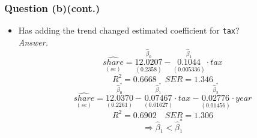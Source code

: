 \documentclass[11pt, xcolor=x11names,compress]{beamer}
\begin{document}
\begin{frame}[fragile,t]
\frametitle{Question (b)(cont.)}
\begin{itemize}
    \item Has adding the trend changed estimated coefficient for \texttt{tax}?\\
\pause
\vspace{5mm}
\textit{Answer.}
\begin{equation*}
    \underset{(se)}{\widehat{share}} = \overset{\hat{\beta}_0}{\underset{(0.2358)}{12.0207}} - \overset{\hat{\beta}_1}{\underset{(0.005336)}{0.1044}} \cdot tax
\end{equation*}
\begin{equation*}
    R^2=0.6668 \quad SER=1.346
\end{equation*}
\vspace{2mm}
\begin{equation*}
    \underset{(se)}{\widehat{share}} = \overset{\hat{\beta}_0^*}{\underset{(0.2261)}{12.0370}} - \overset{\hat{\beta}_1^*}{\underset{(0.01627)}{0.07467}} \cdot tax - \overset{\hat{\beta}_2^*}{\underset{(0.01456)}{0.02776}}\cdot year
\end{equation*}
\begin{equation*}
    R^2=0.6902   \quad SER = 1.306
\end{equation*}
\vspace{2mm}
\begin{equation*}
    \Rightarrow \hat{\beta}_1 < \hat{\beta}_1^*
\end{equation*}
\end{itemize}
\end{frame}
\end{document}
